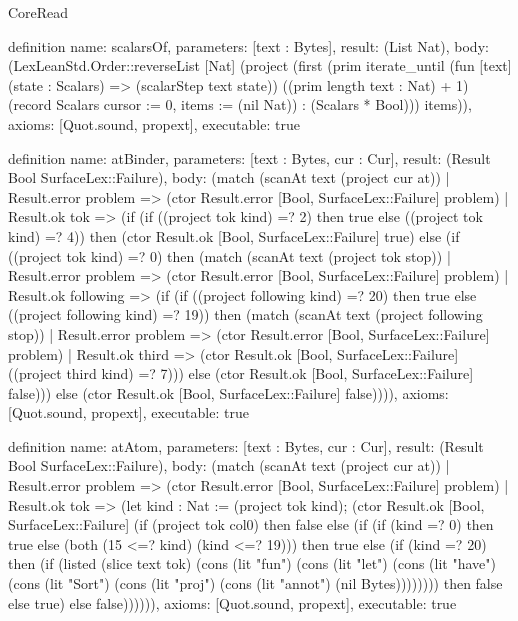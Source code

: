 \begin{lexlean}{CoreRead}
\begin{semanticmodule}
definition{
  name: scalarsOf,
  parameters: [text : Bytes],
  result: (List Nat),
  body: (LexLeanStd.Order::reverseList [Nat] (project (first (prim iterate_until (fun [text] (state : Scalars) => (scalarStep text state)) ((prim length text : Nat) + 1) (record Scalars {cursor := 0, items := (nil Nat)}) : (Scalars * Bool))) items)),
  axioms: [Quot.sound, propext],
  executable: true
}

definition{
  name: atBinder,
  parameters: [text : Bytes, cur : Cur],
  result: (Result Bool SurfaceLex::Failure),
  body: (match (scanAt text (project cur at))
    | Result.error problem => (ctor Result.error [Bool, SurfaceLex::Failure] problem)
    | Result.ok tok => (if (if ((project tok kind) =? 2) then true else ((project tok kind) =? 4)) then (ctor Result.ok [Bool, SurfaceLex::Failure] true) else (if ((project tok kind) =? 0) then (match (scanAt text (project tok stop))
      | Result.error problem => (ctor Result.error [Bool, SurfaceLex::Failure] problem)
      | Result.ok following => (if (if ((project following kind) =? 20) then true else ((project following kind) =? 19)) then (match (scanAt text (project following stop))
        | Result.error problem => (ctor Result.error [Bool, SurfaceLex::Failure] problem)
        | Result.ok third => (ctor Result.ok [Bool, SurfaceLex::Failure] ((project third kind) =? 7))) else (ctor Result.ok [Bool, SurfaceLex::Failure] false))) else (ctor Result.ok [Bool, SurfaceLex::Failure] false)))),
  axioms: [Quot.sound, propext],
  executable: true
}

definition{
  name: atAtom,
  parameters: [text : Bytes, cur : Cur],
  result: (Result Bool SurfaceLex::Failure),
  body: (match (scanAt text (project cur at))
    | Result.error problem => (ctor Result.error [Bool, SurfaceLex::Failure] problem)
    | Result.ok tok => (let kind : Nat := (project tok kind); (ctor Result.ok [Bool, SurfaceLex::Failure] (if (project tok col0) then false else (if (if (kind =? 0) then true else (both (15 <=? kind) (kind <=? 19))) then true else (if (kind =? 20) then (if (listed (slice text tok) (cons (lit "fun") (cons (lit "let") (cons (lit "have") (cons (lit "Sort") (cons (lit "proj") (cons (lit "annot") (nil Bytes)))))))) then false else true) else false)))))),
  axioms: [Quot.sound, propext],
  executable: true
}


\end{semanticmodule}
\end{lexlean}
